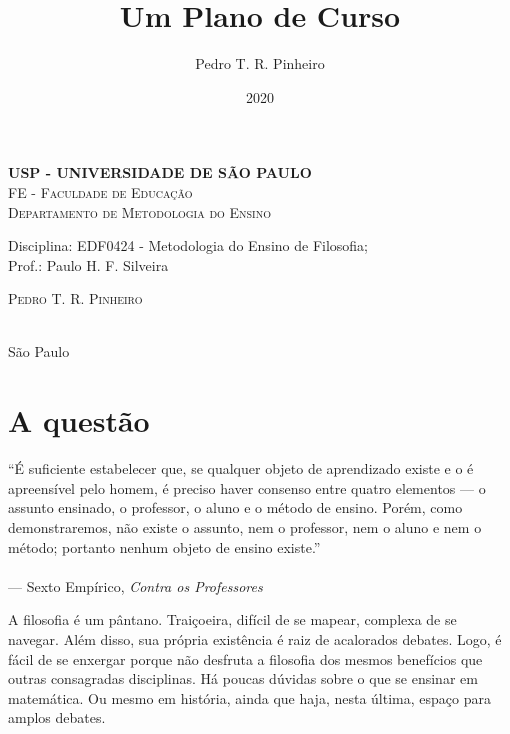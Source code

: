 \documentclass[12pt,a4paper]{article}
\author{Pedro T. R. Pinheiro}
\date{2020}
\title{Um Plano de Curso}
\newenvironment{epigraf}{
	\begin{addmargin}[6cm]{1em} \scriptsize}{\normalfont \end{addmargin}
}
\newcommand{\subtitulo}{}
\newcommand{\disciplina}{EDF0424 - Metodologia do Ensino de Filosofia}
\newcommand{\departamento}{Departamento de Metodologia do Ensino}
\newcommand{\unidade}{FE - Faculdade de Educação}
\newcommand{\prof}{Paulo H. F. Silveira}
\begin{document}
	\begin{center}
				\textbf{
				\LARGE USP - UNIVERSIDADE DE SÃO PAULO \\
			}
			\Large \textsc{\unidade} \\
			\large \textsc{\departamento}\\
			\vspace*{1cm}
				
			Disciplina: \disciplina; \\Prof.: \prof
			\vfill
			\begin{center}
				{\Large \textsc{Pedro T. R. Pinheiro}} \\ 
				\vspace{1cm}
				\LARGE\textbf{\thetitle} \\
				\Large\emph{\subtitulo}
			\end{center}
			\vfill
			\large São Paulo \\
			\large\thedate
			\vspace*{1cm}
			\thispagestyle{empty}
	\end{center}

	\newpage
	
	\setlength{\parskip}{0.5cm}
	\setlength{\parindent}{1.1cm}
	\onehalfspacing	
	
	\section*{A questão}
	
	\setlength{\epigraphrule}{0pt}
	\begin{epigraf}
		``É suficiente estabelecer que, se qualquer objeto de 
		aprendizado existe e o é apreensível pelo homem, é 
		preciso haver consenso entre quatro elementos ---
		o assunto ensinado, o professor, o aluno e o 
		método de ensino. Porém, como demonstraremos, não 
		existe o assunto, nem o professor, nem o aluno e 
		nem o método; portanto nenhum objeto de ensino existe.'' \\
		\\--- Sexto Empírico, \textit{Contra os Professores}%
	\end{epigraf}
	
	A filosofia é um pântano. Traiçoeira, difícil de se mapear, complexa 
	de se navegar. Além disso, sua própria existência é raiz de acalorados 
	debates. Logo, é fácil de se enxergar porque não desfruta a filosofia 
	dos mesmos benefícios que outras consagradas disciplinas. Há poucas 
	dúvidas sobre o que se ensinar em matemática. Ou mesmo em história, 
	ainda que haja, nesta última, espaço para amplos debates. 
\end{document}
